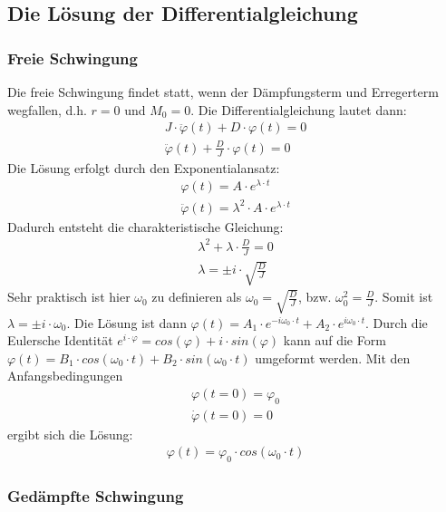 \documentclass{article}
\begin{document}
\subsection{Die Lösung der Differentialgleichung}
\subsubsection{Freie Schwingung}
Die freie Schwingung findet statt, wenn der Dämpfungsterm und Erregerterm wegfallen, d.h. $r = 0$ und $M_{0} = 0$.
Die Differentialgleichung lautet dann:
\begin{gather} \label{eq:freie_schwingung}
    J \cdot \ddot \varphi(t) + D \cdot \varphi(t) = 0\\
    \ddot \varphi(t) + \frac{D}{J} \cdot \varphi(t) = 0
\end{gather}
Die Lösung erfolgt durch den Exponentialansatz:
\begin{gather} \label{eq:freie_schwingung_ansatz}
    \varphi(t) = A \cdot e^{\lambda \cdot t}\\
    \ddot \varphi(t) = \lambda^{2} \cdot A \cdot e^{\lambda \cdot t}
\end{gather}
Dadurch entsteht die charakteristische Gleichung:
\begin{gather} \label{eq:freie_schwingung_loesung}
    \lambda^{2} + \lambda \cdot \frac{D}{J} = 0\\
    \lambda = \pm i \cdot \sqrt{\frac{D}{J}}
\end{gather}
Sehr praktisch ist hier $\omega_{0}$ zu definieren als $\omega_{0} = \sqrt{\frac{D}{J}}$, bzw. $\omega_{0}^{2} = \frac{D}{J}$.
Somit ist $\lambda = \pm i \cdot \omega_{0}$. Die Lösung ist dann
$\varphi(t) = A_{1} \cdot e^{-i \omega_{0} \cdot t} + A_{2} \cdot e^{i \omega_{0} \cdot t}$.
Durch die Eulersche Identität $e^{i \cdot \varphi} = cos(\varphi) + i \cdot sin(\varphi)$ kann auf die Form
$\varphi(t) = B_{1} \cdot cos(\omega_{0} \cdot t) + B_{2} \cdot sin(\omega_{0} \cdot t)$ umgeformt werden. Mit den Anfangsbedingungen
\begin{gather} \label{eq:freie_schwingung_loesung}
    \varphi(t = 0) = \varphi_{0}\\
    \dot \varphi(t = 0) = 0
\end{gather}
ergibt sich die Lösung:
\begin{gather} \label{eq:freie_schwingung_loesung}
    \varphi(t) = \varphi_{0} \cdot cos(\omega_{0} \cdot t)
\end{gather}
\subsubsection{Gedämpfte Schwingung}
\end{document}
